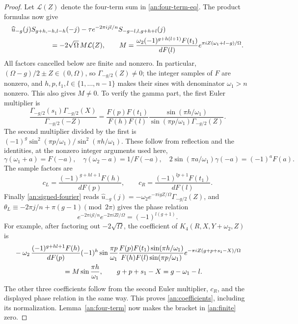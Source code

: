 \begin{proof}
Let $\mathcal L(Z)$ denote the four-term sum in
\eqref{an:four-term-eq}.  The product formulas now give
\begin{equation}
\begin{split}
 &\widehat u_{-g}(j)S_{g+h,-h,l-h}(-j)
       -\tau e^{-2\pi ijl/n}S_{-g-l,l,g+h+l}(j)\\
 &\hspace{20mm}=-2\sqrt\Omega\,M\mathcal L(Z),\qquad
 M=\frac{\omega_2(-1)^{g+h(l+1)}F(t_1)}{dF(l)}
                          e^{\pi iZ(\omega_1+l-g)/\Omega}.
\end{split}
 \label{an:coefficients}
\end{equation}
All factors cancelled below are finite and nonzero.  In particular,
$(\Omega-g)/2\pm Z\in(0,\Omega)$, so
$\Gamma_{-g/2}(Z)\ne0$; the integer samples of $F$ are nonzero, and
$h,p,t_1,l\in\{1,\ldots,n-1\}$ makes their sines with denominator
$\omega_1>n$ nonzero.  This also gives $M\ne0$.
To verify the gamma part, the first Euler multiplier is
\[
 \frac{\Gamma_{-g/2}(s_1)\Gamma_{-g/2}(X)}{\Gamma_{-g/2}(-Z)}
 =\frac{F(p)F(t_1)}{F(h)F(l)}
       \frac{\sin(\pi h/\omega_1)}{\sin(\pi p/\omega_1)\Gamma_{-g/2}(Z)}.
\]
The second multiplier divided by the first is
$(-1)^g\sin^2(\pi p/\omega_1)/\sin^2(\pi h/\omega_1)$.
These follow from reflection and the identities, at the nonzero
integer arguments used here,
\[
 \gamma(\omega_1+a)=F(-a),\quad \gamma(\omega_2-a)=1/F(-a),\quad
 2\sin(\pi a/\omega_1)\gamma(-a)=(-1)^aF(a).
\]
The sample factors are
\[
 c_L=\frac{(-1)^{g+hl+1}F(h)}{dF(p)},\qquad
 c_R=\frac{(-1)^{lp+1}F(t_1)}{dF(l)}.
\]
Finally \eqref{an:signed-fourier} reads
$\widehat u_{-g}(j)=-\omega_2 e^{-\pi igZ/\Omega}\Gamma_{-g/2}(Z)$, and
$\theta_L\equiv-2\pi j/n+\pi(g-1)\pmod{2\pi}$
gives the phase relation
\[
 e^{-2\pi ijl/n}e^{-2\pi iZl/\Omega}=(-1)^{l(g+1)}.
\]
For example, after factoring out $-2\sqrt\Omega$, the coefficient of
$K_4(R,X,Y+\omega_2,Z)$ is
\begin{align*}
 &-\omega_2\,
 \frac{(-1)^{g+hl+1}F(h)}{dF(p)}
 (-1)^h\sin\frac{\pi p}{\omega_1}
 \frac{F(p)F(t_1)\sin(\pi h/\omega_1)}
      {F(h)F(l)\sin(\pi p/\omega_1)}
 e^{-\pi iZ(g+p+s_1-X)/\Omega}\\
 &\hspace{25mm}=M\sin\frac{\pi h}{\omega_1},
 \qquad g+p+s_1-X=g-\omega_1-l.
\end{align*}
The other three coefficients follow from the second Euler multiplier,
$c_R$, and the displayed phase relation in the same way.  This proves
\eqref{an:coefficients}, including its normalization.
Lemma~\ref{an:four-term} now makes the bracket in
\eqref{an:finite} zero.
\end{proof}
